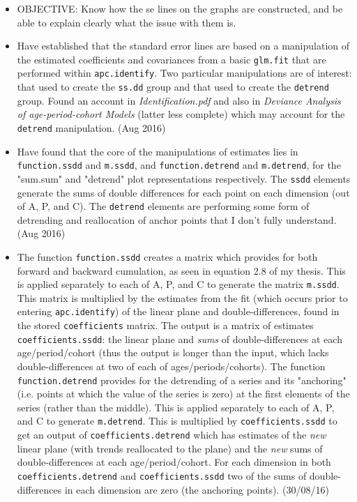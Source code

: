 \documentclass[]{article}
\begin{document}
\begin{itemize}
\item OBJECTIVE: Know how the se lines on the graphs are constructed, and be able to explain clearly what the issue with them is.

\item Have established that the standard error lines are based on a manipulation of the estimated coefficients and covariances from a basic \texttt{glm.fit} that are performed within \texttt{apc.identify}. Two particular manipulations are of interest: that used to create the \texttt{ss.dd} group and that used to create the \texttt{detrend} group. Found an account in \textit{Identification.pdf} and also in \textit{Deviance Analysis of age-period-cohort Models} (latter less complete) which may account for the \texttt{detrend} manipulation. (Aug 2016)
\item Have found that the core of the manipulations of estimates lies in \texttt{function.ssdd} and \texttt{m.ssdd}, and \texttt{function.detrend} and \texttt{m.detrend}, for the "sum.sum" and "detrend" plot representations respectively. The \texttt{ssdd} elements generate the sums of double differences for each point on each dimension (out of A, P, and C). The \texttt{detrend} elements are performing some form of detrending and reallocation of anchor points that I don't fully understand. (Aug 2016)
\item The function \texttt{function.ssdd} creates a matrix which provides for both forward and backward cumulation, as seen in equation 2.8 of my thesis. This is applied separately to each of A, P, and C to generate the matrix \texttt{m.ssdd}. This matrix is multiplied by the estimates from the fit (which occurs prior to entering \texttt{apc.identify}) of the linear plane and double-differences, found in the stored \texttt{coefficients} matrix. The output is a matrix of estimates \texttt{coefficients.ssdd}: the linear plane and \emph{sums} of double-differences at each age/period/cohort (thus the output is longer than the input, which lacks double-differences at two of each of ages/periods/cohorts). The function \texttt{function.detrend} provides for the detrending of a series and its "anchoring" (i.e. points at which the value of the series is zero)  at the first elements of the series (rather than the middle). This is applied separately to each of A, P, and C to generate \texttt{m.detrend}. This is multiplied by \texttt{coefficients.ssdd} to get an output of \texttt{coefficients.detrend} which has estimates of the \emph{new} linear plane (with trends reallocated to the plane) and the \emph{new} sums of double-differences at each age/period/cohort. For each dimension in both \texttt{coefficients.detrend} and \texttt{coefficients.ssdd} two of the sums of double-differences in each dimension are zero (the anchoring points). (30/08/16)

\end{itemize}
\end{document}
